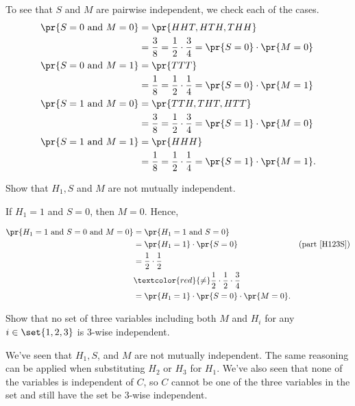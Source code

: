 \begin{problem}
\begin{solution}
To see that $S$ and $M$ are pairwise independent, we check each of the cases.
\begin{align*}
\pr{S=0 \text{ and } M=0} & = \pr{HHT,HTH,THH}\\
    & = \frac{3}{8} = \frac{1}{2} \cdot \frac{3}{4} =\pr{S=0} \cdot \pr{M = 0}\\
\pr{S=0 \text{ and } M=1} & = \pr{TTT}\\
    & = \frac{1}{8} = \frac{1}{2} \cdot \frac{1}{4} =\pr{S=0} \cdot \pr{M = 1}\\
\pr{S=1 \text{ and } M=0} & = \pr{TTH,THT,HTT}\\
    & = \frac{3}{8} = \frac{1}{2} \cdot \frac{3}{4} =\pr{S = 1} \cdot \pr{M = 0}\\
\pr{S=1 \text{ and } M=1} & = \pr{HHH}\\
    & = \frac{1}{8} = \frac{1}{2} \cdot \frac{1}{4} =\pr{S = 1} \cdot \pr{M = 1}.
\end{align*}

\end{solution}

\ppart Show that $H_1,S$ and $M$  are not mutually independent.

\begin{solution}
If $H_1=1$ and $S=0$, then $M=0$.  Hence,

\begin{align*}
\pr{H_1=1 \text{ and } S=0 \text{ and } M=0} & = \pr{H_1=1 \text{ and } S=0}\\
    & = \pr{H_1=1}\cdot \pr{S=0}  & \text{(part~\eqref{H123S})}\\
    & = \frac{1}{2} \cdot  \frac{1}{2}\\
    & \textcolor{red}{\neq} \frac{1}{2} \cdot  \frac{1}{2} \cdot \frac{3}{4}\\
    & = \pr{H_1=1}\cdot \pr{S=0} \cdot \pr{M=0}.
\end{align*}
\end{solution}

\ppart Show that no set of three variables including both $M$ and $H_i$
for any $i\in \set{1,2,3}$ is 3-wise independent.

\begin{solution}

We've seen that $H_1,S$, and $M$ are not mutually independent.
  The same reasoning can be applied when substituting $H_2$ or $H_3$ for
  $H_1$.  We've also seen that none of the variables is independent of
  $C$, so $C$ cannot be one of the three variables in the set and still
  have the set be 3-wise independent.


\end{solution}
\end{problem}
